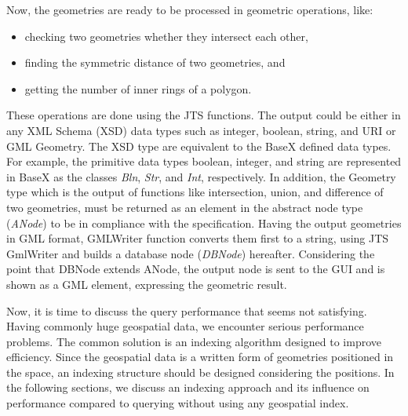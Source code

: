\documentclass[a4paper,12pt]{article}
\begin{document}
Now, the geometries are ready to be processed in geometric operations, like:
\begin{itemize}
\item checking two geometries whether they intersect each other,
\item finding the symmetric distance of two geometries, and
\item getting the number of inner rings of a polygon.
\end{itemize}
These operations are done using the JTS functions. The output could be either in any XML Schema (XSD) data types such as integer, boolean, string, and URI or GML Geometry. The XSD type are equivalent to the BaseX defined data types. For example, the primitive data types boolean, integer, and string are represented in BaseX as the classes \textit{Bln}, \textit{Str}, and \textit{Int}, respectively. In addition, the Geometry type which is the output of functions like intersection, union, and difference of two geometries, must be returned as an element in the abstract node type (\textit{ANode}) to be in compliance with the specification. Having the output geometries in GML format, GMLWriter function converts them first to a string, using JTS GmlWriter and builds a database node (\textit{DBNode}) hereafter. Considering the point that DBNode extends ANode, the output node is sent to the GUI and is shown as a GML element, expressing the geometric result. 

Now, it is time to discuss the query performance that seems not satisfying. Having commonly huge geospatial data, we encounter serious performance problems. The common solution is an indexing algorithm designed to improve efficiency. Since the geospatial data is a written form of geometries positioned in the space, an indexing structure should be designed considering the positions. In the following sections, we discuss an indexing approach and its influence on performance compared to querying without using any geospatial index.
\end{document}
